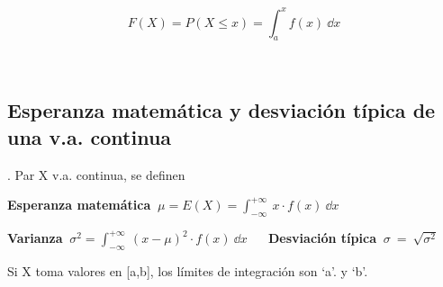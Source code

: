 \begin{multicols}{2}


$\quad$

$\quad$

$$ F(X)=P(X\le x)=\displaystyle \int_a^x f(x) \ \dd x$$

$\quad$
\end{multicols}



\subsection{Esperanza matemática y desviación típica de una v.a. continua}


\begin{definition}
.	Par X v.a. continua, se definen	

\vspace{2mm} \hspace{1cm} \textbf{Esperanza matemática} $\ \mu=E(X)=\displaystyle \int_{-\infty}^{+\infty}\ x\cdot f(x)\ \dd x$

\vspace{2mm} \hspace{1cm} \textbf{Varianza} $\ \sigma^2=\displaystyle \int_{-\infty}^{+\infty}\ (x -\mu)^2\cdot f(x)\ \dd x$
$\quad$ \textbf{Desviación típica} $\ \sigma \ =\  \sqrt{\sigma^2}$

\vspace{2mm} Si X toma valores en [a,b], los límites de integración son `a'. y `b'. 
\end{definition}

